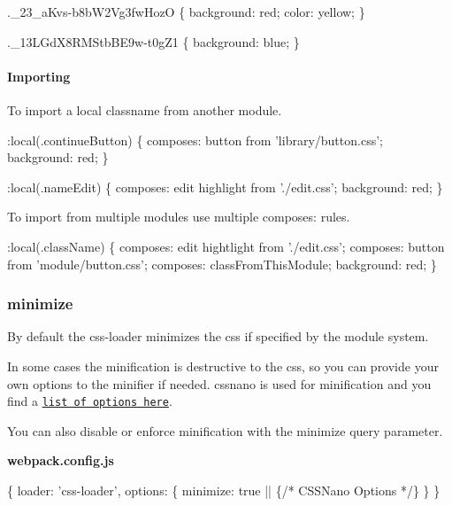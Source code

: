 \begin{DoxyCode}
.\_23\_aKvs-b8bW2Vg3fwHozO \{
  background: red;
  color: yellow;
\}

.\_13LGdX8RMStbBE9w-t0gZ1 \{
  background: blue;
\}
\end{DoxyCode}


\paragraph*{{\ttfamily Importing}}

To import a local classname from another module.


\begin{DoxyCode}
:local(.continueButton) \{
  composes: button from 'library/button.css';
  background: red;
\}
\end{DoxyCode}



\begin{DoxyCode}
:local(.nameEdit) \{
  composes: edit highlight from './edit.css';
  background: red;
\}
\end{DoxyCode}


To import from multiple modules use multiple {\ttfamily composes\+:} rules.


\begin{DoxyCode}
:local(.className) \{
  composes: edit hightlight from './edit.css';
  composes: button from 'module/button.css';
  composes: classFromThisModule;
  background: red;
\}
\end{DoxyCode}


\subsubsection*{{\ttfamily minimize}}

By default the css-\/loader minimizes the css if specified by the module system.

In some cases the minification is destructive to the css, so you can provide your own options to the minifier if needed. cssnano is used for minification and you find a \href{http://cssnano.co/options/}{\tt list of options here}.

You can also disable or enforce minification with the {\ttfamily minimize} query parameter.

{\bfseries webpack.\+config.\+js} 
\begin{DoxyCode}
\{
  loader: 'css-loader',
  options: \{
    minimize: true || \{/* CSSNano Options */\}
  \}
\}
\end{DoxyCode}


